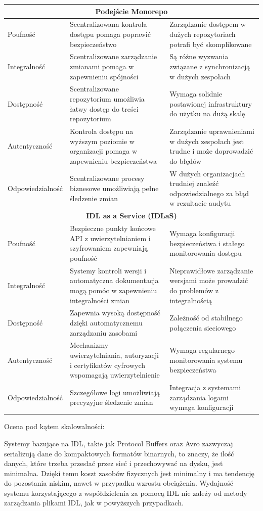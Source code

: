 \documentclass[runningheads,12pt]{llncs}
\begin{document}
\begin{longtable}{|p{4cm}|p{4cm}|p{4cm}|}
    \multicolumn{3}{|c|}{\textbf{Podejście Monorepo}} \\ \hline
    Poufność & Scentralizowana kontrola dostępu pomaga poprawić bezpieczeństwo & Zarządzanie dostępem w dużych repozytoriach potrafi być skomplikowane \\ \hline
    Integralność & Scentralizowane zarządzanie zmianami pomaga w zapewnieniu spójności & Są różne wyzwania związane z synchronizacją w dużych zespołach \\ \hline
    Dostępność & Scentralizowane repozytorium umożliwia łatwy dostęp do treści repozytorium & Wymaga solidnie postawionej infrastruktury do użytku na dużą skalę \\ \hline
    Autentyczność & Kontrola dostępu na wyższym poziomie w organizacji pomaga w zapewnieniu bezpieczeństwa & Zarządzanie uprawnieniami w dużych zespołach jest trudne i może doprowadzić do błędów \\ \hline
    Odpowiedzialność & Scentralizowane procesy biznesowe umożliwiają pełne śledzenie zmian & W dużych organizacjach trudniej znaleźć odpowiedzialnego za błąd w rezultacie audytu \\ \hline
    \multicolumn{3}{|c|}{\textbf{IDL as a Service (IDLaS)}} \\ \hline
    Poufność & Bezpieczne punkty końcowe API z uwierzytelnianiem i szyfrowaniem zapewniają poufność & Wymaga konfiguracji bezpieczeństwa i stałego monitorowania dostępu \\ \hline
    Integralność & Systemy kontroli wersji i automatyczna dokumentacja mogą pomóc w zapewnieniu integralności zmian & Nieprawidłowe zarządzanie wersjami może prowadzić do problemów z integralnością \\ \hline
    Dostępność & Zapewnia wysoką dostępność dzięki automatycznemu zarządzaniu zasobami & Zależność od stabilnego połączenia sieciowego \\ \hline
    Autentyczność & Mechanizmy uwierzytelniania, autoryzacji i certyfikatów cyfrowych wspomagają uwierzytelnienie & Wymaga regularnego monitorowania systemu bezpieczeństwa \\ \hline
    Odpowiedzialność & Szczegółowe logi umożliwiają precyzyjne śledzenie zmian & Integracja z systemami zarządzania logami wymaga konfiguracji \\ \hline
\end{longtable}

Ocena pod kątem skalowalności:

Systemy bazujące na IDL, takie jak Protocol Buffers oraz Avro zazwyczaj serializują dane do kompaktowych formatów binarnych, to znaczy, że ilość danych, które trzeba przesłać przez sieć i przechowywać na dysku, jest minimalna. Dzięki temu koszt zasobów fizycznych jest minimalny i ma tendencję do pozostania niskim, nawet w przypadku wzrostu obciążenia. Wydajność systemu korzystającego z współdzielenia za pomocą IDL nie zależy od metody zarządzania plikami IDL, jak w powyższych przypadkach.
\end{document}
